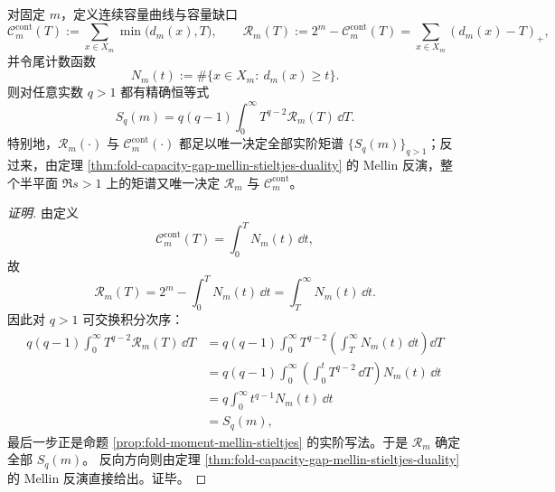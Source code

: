 \begin{conclusion}\label{con:xi-terminal-capacity-gap-real-mellin-stieltjes-duality}
对固定 \(m\)，定义连续容量曲线与容量缺口
\[
\mathcal C_m^{\mathrm{cont}}(T):=\sum_{x\in X_m}\min\bigl(d_m(x),T\bigr),
\qquad
\mathcal R_m(T):=2^m-\mathcal C_m^{\mathrm{cont}}(T)
=\sum_{x\in X_m}(d_m(x)-T)_+,
\]
并令尾计数函数
\[
N_m(t):=\#\{x\in X_m:\ d_m(x)\ge t\}.
\]
则对任意实数 \(q>1\) 都有精确恒等式
\[
\boxed{\;
S_q(m)=q(q-1)\int_{0}^{\infty}T^{q-2}\mathcal R_m(T)\,\dd T.\;}
\]
特别地，\(\mathcal R_m(\cdot)\) 与 \(\mathcal C_m^{\mathrm{cont}}(\cdot)\) 都足以唯一决定全部实阶矩谱 \(\{S_q(m)\}_{q>1}\)；反过来，由定理 \ref{thm:fold-capacity-gap-mellin-stieltjes-duality} 的 Mellin 反演，整个半平面 \(\Re s>1\) 上的矩谱又唯一决定 \(\mathcal R_m\) 与 \(\mathcal C_m^{\mathrm{cont}}\)。
\end{conclusion}
\begin{proof}[证明]
由定义
\[
\mathcal C_m^{\mathrm{cont}}(T)=\int_{0}^{T}N_m(t)\,\dd t,
\]
故
\[
\mathcal R_m(T)
=
2^m-\int_{0}^{T}N_m(t)\,\dd t
=
\int_{T}^{\infty}N_m(t)\,\dd t.
\]
因此对 \(q>1\) 可交换积分次序：
\[
\begin{aligned}
q(q-1)\int_{0}^{\infty}T^{q-2}\mathcal R_m(T)\,\dd T
&=
q(q-1)\int_{0}^{\infty}T^{q-2}\left(\int_{T}^{\infty}N_m(t)\,\dd t\right)\dd T\\
&=
q(q-1)\int_{0}^{\infty}\left(\int_{0}^{t}T^{q-2}\,\dd T\right)N_m(t)\,\dd t\\
&=
q\int_{0}^{\infty}t^{q-1}N_m(t)\,\dd t\\
&=
S_q(m),
\end{aligned}
\]
最后一步正是命题 \ref{prop:fold-moment-mellin-stieltjes} 的实阶写法。于是 \(\mathcal R_m\) 确定全部 \(S_q(m)\)。
反向方向则由定理 \ref{thm:fold-capacity-gap-mellin-stieltjes-duality} 的 Mellin 反演直接给出。证毕。
\end{proof}

